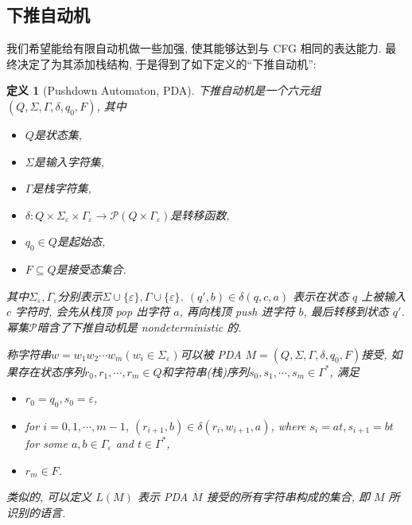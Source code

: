 \documentclass[8pt]{article}
\theoremstyle{compact}
\newtheorem{definition}{定义}[section]
\begin{document}
\subsection{下推自动机}

我们希望能给有限自动机做一些加强, 使其能够达到与 CFG 相同的表达能力. 最终决定了为其添加栈结构, 于是得到了如下定义的“下推自动机”:

\begin{definition}[Pushdown Automaton, PDA]
	下推自动机是一个六元组$(Q, \Sigma, \Gamma, \delta, q_0, F)$, 其中
	\begin{itemize}
		\item $Q$是状态集, 
		\item $\Sigma$是输入字符集, 
		\item $\Gamma$是栈字符集, 
		\item $\delta: Q \times \Sigma_{\varepsilon} \times \Gamma_{\varepsilon} \to \mathcal P(Q \times \Gamma_{\varepsilon})$是转移函数, 
		\item $q_0 \in Q$是起始态, 
		\item $F \subseteq Q$是接受态集合. 
	\end{itemize}

	其中$\Sigma_{\varepsilon}, \Gamma_{\varepsilon}$分别表示$\Sigma \cup \{\varepsilon\}, \Gamma \cup \{\varepsilon\}$. $(q', b) \in \delta(q, c, a)$ 表示在状态 $q$ 上被输入 $c$ 字符时, 会先从栈顶 pop 出字符 $a$, 再向栈顶 push 进字符 $b$, 最后转移到状态 $q'$. 幂集$\mathcal P$暗含了下推自动机是 nondeterministic 的. 

	称字符串$w = w_1w_2\cdots w_m(w_i \in \Sigma_{\varepsilon})$可以被 PDA $M = (Q, \Sigma, \Gamma, \delta, q_0, F)$接受, 如果存在状态序列$r_0, r_1, \cdots, r_m \in Q$和字符串(栈)序列$s_0, s_1, \cdots, s_m \in \Gamma^*$, 满足
	\begin{itemize}
		\item $r_0 = q_0, s_0 = \varepsilon$,
		\item for $i = 0, 1, \cdots, m-1$, $(r_{i+1}, b) \in \delta(r_i, w_{i+1}, a)$, where $s_i = at, s_{i+1}=bt$ for some $a, b \in \Gamma_{\varepsilon}$ and $t \in \Gamma^*$,
		\item $r_m \in F$.
	\end{itemize}

	类似的, 可以定义 $L(M)$ 表示 PDA $M$ 接受的所有字符串构成的集合, 即 $M$ 所识别的语言.
\end{definition}
\end{document}
